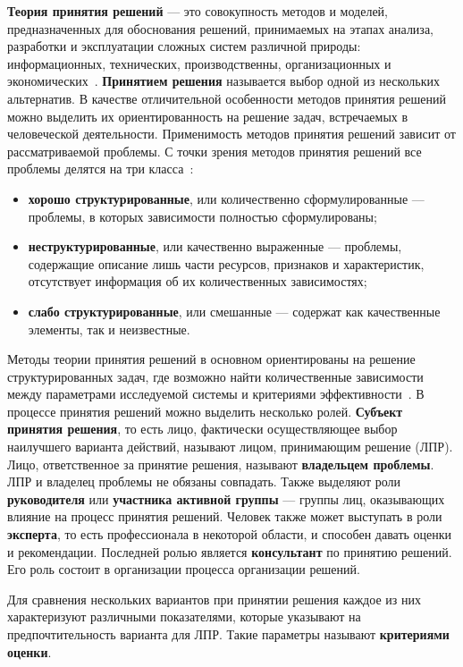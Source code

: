 \textbf{Теория принятия решений} --- это совокупность методов и моделей, предназначенных для обоснования решений, принимаемых на этапах анализа, разработки и эксплуатации сложных систем различной природы: информационных, технических, производственны, организационных и экономических~\cite{chernomor}.
\textbf{Принятием решения} называется выбор одной из нескольких альтернатив.
В качестве отличительной особенности методов принятия решений можно выделить их ориентированность на решение задач, встречаемых в человеческой деятельности.
Применимость методов принятия решений зависит от рассматриваемой проблемы.
С точки зрения методов принятия решений все проблемы делятся на три класса~\cite{foundations}:
\begin{itemize} 
    \item \textbf{хорошо структурированные}, или количественно сформулированные --- проблемы, в которых зависимости полностью сформулированы;
    \item \textbf{неструктурированные}, или качественно выраженные --- проблемы, содержащие описание лишь части ресурсов, признаков и характеристик, отсутствует информация об их количественных зависимостях;
    \item \textbf{слабо структурированные}, или смешанные --- содержат как качественные элементы, так и неизвестные.
\end{itemize}

Методы теории принятия решений в основном ориентированы на решение структурированных задач, где возможно найти количественные зависимости между параметрами исследуемой системы и критериями эффективности~\cite{larichev}.
В процессе принятия решений можно выделить несколько ролей. 
\textbf{Субъект принятия решения}, то есть лицо, фактически осуществляющее выбор наилучшего варианта действий, называют лицом, принимающим решение (ЛПР). 
Лицо, ответственное за принятие решения, называют \textbf{владельцем проблемы}. 
ЛПР и владелец проблемы не обязаны совпадать. 
Также выделяют роли \textbf{руководителя} или \textbf{участника активной группы} --- группы лиц, оказывающих влияние на процесс принятия решений. 
Человек также может выступать в роли \textbf{эксперта}, то есть профессионала в некоторой области, и способен давать оценки и рекомендации.
Последней ролью является \textbf{консультант} по принятию решений. 
Его роль состоит в организации процесса организации решений.

Для сравнения нескольких вариантов при принятии решения каждое из них характеризуют различными показателями, которые указывают на предпочтительность варианта для ЛПР.
Такие параметры называют \textbf{критериями оценки}.


